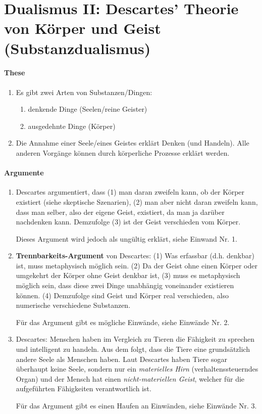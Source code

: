 \documentclass[../main.tex]{subfiles}
\begin{document}
\section{Dualismus II: Descartes' Theorie von Körper und Geist (Substanzdualismus)}
\paragraph{These} 
\begin{enumerate}
	\item Es gibt zwei Arten von Substanzen/Dingen: 
	\begin{enumerate}
		\item denkende Dinge (Seelen/reine Geister)
		\item ausgedehnte Dinge (Körper)
	\end{enumerate}
	\item Die Annahme einer Seele/eines Geistes erklärt Denken (und Handeln). Alle anderen Vorgänge können durch körperliche Prozesse erklärt werden. 
\end{enumerate}
\paragraph{Argumente}
\begin{enumerate}
	\item Descartes argumentiert, dass (1) man daran zweifeln kann, ob der Körper existiert (siehe skeptische Szenarien), (2) man aber nicht daran zweifeln kann, dass man selber, also der eigene Geist, existiert, da man ja darüber nachdenken kann. Demzufolge (3) ist der Geist verschieden vom Körper. 
		
		Dieses Argument wird jedoch als ungültig erklärt, siehe Einwand Nr. 1.
	\item \textbf{Trennbarkeits-Argument} von Descartes: (1) Was erfassbar (d.h. denkbar) ist, muss metaphysisch möglich sein. (2) Da der Geist ohne einen Körper oder umgekehrt der Körper ohne Geist denkbar ist, (3) muss es metaphysisch möglich sein, dass diese zwei Dinge unabhängig voneinander existieren können. (4) Demzufolge sind Geist und Körper real verschieden, also numerische verschiedene Substanzen. 
		
		Für das Argument gibt es mögliche Einwände, siehe Einwände Nr. 2. 
	\item Descartes: Menschen haben im Vergleich zu Tieren die Fähigkeit zu sprechen und intelligent zu handeln. Aus dem folgt, dass die Tiere eine grundsätzlich andere Seele als Menschen haben. Laut Descartes haben Tiere sogar überhaupt keine Seele, sondern nur ein \textit{materielles Hirn} (verhaltenssteuerndes Organ) und der Mensch hat einen \textit{nicht-materiellen Geist}, welcher für die aufgeführten Fähigkeiten verantwortlich ist. 
		
		Für das Argument gibt es einen Haufen an Einwänden, siehe Einwände Nr. 3. 
\end{enumerate}
\end{document}
